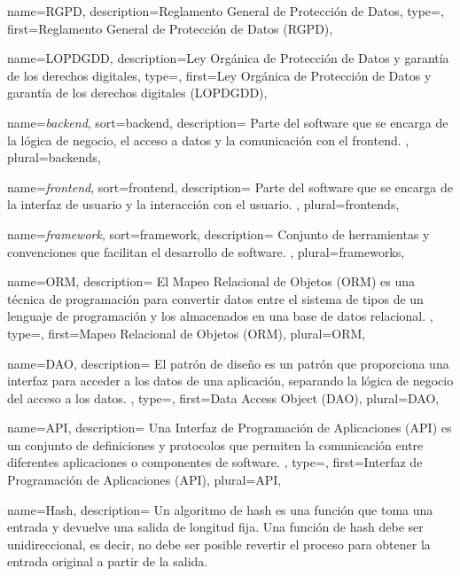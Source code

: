 {
    name={RGPD},
    description={Reglamento General de Protección de Datos},
    type=\acronymtype,
    first={Reglamento General de Protección de Datos (RGPD)},
}

{
    name={LOPDGDD},
    description={Ley Orgánica de Protección de Datos y garantía de los derechos digitales},
    type=\acronymtype,
    first={Ley Orgánica de Protección de Datos y garantía de los derechos digitales (LOPDGDD)},
}

{
    name={\textit{backend}},
    sort={backend},
    description={
        Parte del software que se encarga de la lógica de negocio, el acceso a datos y la
        comunicación con el frontend.
    },
    plural={backends},
}

{
    name={\textit{frontend}},
    sort={frontend},
    description={
        Parte del software que se encarga de la interfaz de usuario y la interacción con el usuario.
    },
    plural={frontends},
}

{
    name={\textit{framework}},
    sort={framework},
    description={
        Conjunto de herramientas y convenciones que facilitan el desarrollo de software.
    },
    plural={frameworks},
}

{
    name={ORM},
    description={
        El Mapeo Relacional de Objetos (ORM) es una técnica de programación para convertir datos
        entre el sistema de tipos de un lenguaje de programación y los almacenados en una base de
        datos relacional.
    },
    type=\acronymtype,
    first={Mapeo Relacional de Objetos (ORM)},
    plural={ORM},
}

{
    name={DAO},
    description={
        El patrón de diseño  es un patrón que proporciona una interfaz para acceder
        a los datos de una aplicación, separando la lógica de negocio del acceso a los datos.
    },
    type=\acronymtype,
    first={Data Access Object (DAO)},
    plural={DAO},
}

{
    name={API},
    description={
        Una Interfaz de Programación de Aplicaciones (API) es un conjunto de definiciones y protocolos
        que permiten la comunicación entre diferentes aplicaciones o componentes de software.
    },
    type=\acronymtype,
    first={Interfaz de Programación de Aplicaciones (API)},
    plural={API},
}

{
    name={Hash},
    description={
        Un algoritmo de hash es una función que toma una entrada y devuelve una salida de longitud fija.
        Una función de hash debe ser unidireccional, es decir, no debe ser posible revertir el proceso
        para obtener la entrada original a partir de la salida.
    }
}

